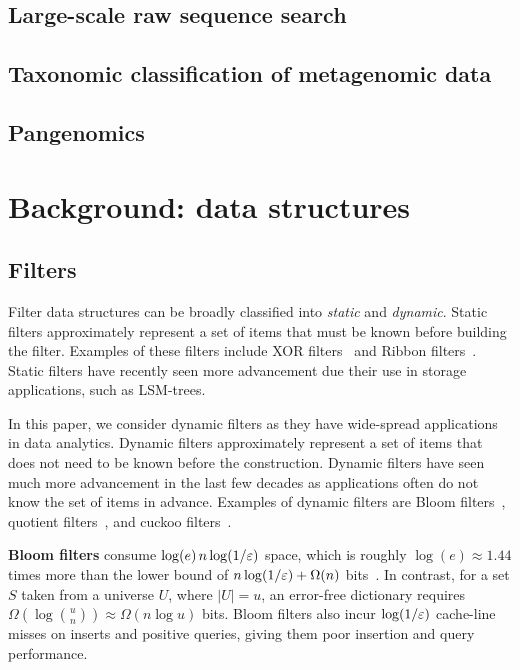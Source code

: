\subsection{Large-scale raw sequence search}

\subsection{Taxonomic classification of metagenomic data}

\subsection{Pangenomics}


\section{Background: data structures}


\subsection{Filters}\label{sec:prelim}

Filter data structures can be broadly classified into \emph{static} and
\emph{dynamic}.  Static filters approximately represent a set of items that must
be known before building the filter. Examples of these filters include XOR
filters~\cite{GrafLe20} and Ribbon filters~\cite{DillingerWalzer21}. Static
filters have recently seen more advancement due their use in storage
applications, such as LSM-trees.


In this paper, we consider dynamic filters as they have wide-spread applications
in data analytics.  Dynamic filters approximately represent a set of items that
does not need to be known before the construction. Dynamic filters have seen
much more advancement in the last few decades as applications often do not know
the set of items in advance. Examples of dynamic filters are Bloom
filters~\cite{Bloom70}, quotient filters~\cite{BenderFaJo12,
PandeyBJP17b,DillingerMa09,PaghPaRa05,EinzigerFr16}, and cuckoo
filters~\cite{FanAnKa14,BreslowJ18}.

\textbf{Bloom filters} consume $\log(e)\, n\log (1/\varepsilon)$ space, which is roughly
$\log(e)\approx 1.44$ times more than the lower bound of $n\log (1/\varepsilon) + \Omega(n)$
bits~\cite{CarterFG78}. In contrast, for a set $S$ taken from a universe $U$,
where $|U|=u$, an error-free dictionary requires $\Omega(\log {u\choose n})
\approx \Omega(n \log u)$ bits. Bloom filters also incur $\log (1/\varepsilon)$ cache-line
misses on inserts and positive queries, giving them poor insertion and query
performance.


